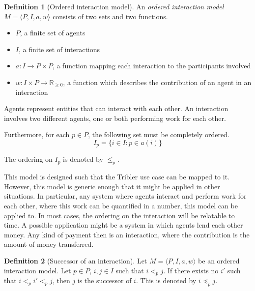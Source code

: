 \documentclass[a4paper,11pt]{book}
\newcommand{\bb}{\mathbb}
\newcommand\nicetohave[1]{\textcolor{orange}{TODO: #1}}
\theoremstyle{definition}
\newtheorem{definition}{Definition}
\begin{document}
\begin{definition}[Ordered interaction model]
    An \emph{ordered interaction model} $M=\langle P, I, a, w \rangle$ consists of two sets and two functions.
    
    \begin{itemize}
        \item $P$, a finite set of agents
        \item $I$, a finite set of interactions
        \item $a: I \to P \times P$, a function mapping each interaction to the participants involved
        \item $w: I \times P \to \bb{R}_{\geq0}$, a function which describes the contribution of an agent in an interaction
    \end{itemize}

    Agents represent entities that can interact with each other.
    An interaction involves two different agents, one or both performing
    work for each other. 
   
    Furthermore, for each $p \in P$, the following set must be completely ordered.
    \begin{equation*}
        I_p = \{i \in I : p \in a(i)\}
    \end{equation*}

    The ordering on $I_p$ is denoted by $\leq_p$.
\end{definition}

This model is designed such that the Tribler use case can be mapped to it. However, this model is
generic enough that it might be applied in other situations. In particular, any system where
agents interact and perform work for each other, where this work can be quantified in a number,
this model can be applied to. In most cases, the ordering on the interaction will be relatable
to time. A possible application might be a system in which agents lend each other money. Any
kind of payment then is an interaction, where the contribution is the amount of money transferred.

\begin{definition}[Successor of an interaction]
    Let $M=\langle P, I, a, w \rangle$ be an ordered interaction model.
    Let $p \in P$, $i, j \in I$ such that $i <_p j$. If there exists no $i'$ such that $i <_p i' <_p j$, then
    $j$ is the successor of $i$. This is denoted by $i \preceq_p j$.
\end{definition}
 
\end{document}

